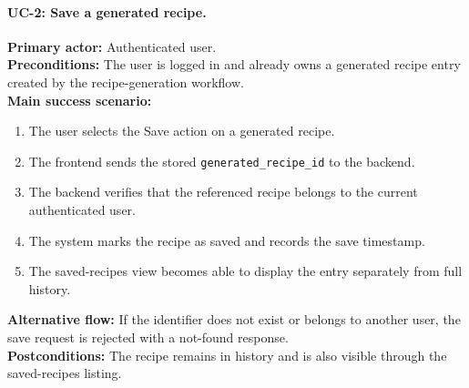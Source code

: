 \paragraph{UC-2: Save a generated recipe.}
\textbf{Primary actor:} Authenticated user. \\
\textbf{Preconditions:} The user is logged in and already owns a
generated recipe entry created by the recipe-generation workflow. \\
\textbf{Main success scenario:}
\begin{enumerate}
	\item The user selects the Save action on a generated recipe.
	\item The frontend sends the stored \texttt{generated\_recipe\_id} to
	the backend.
	\item The backend verifies that the referenced recipe belongs to the
	current authenticated user.
	\item The system marks the recipe as saved and records the save
	timestamp.
	\item The saved-recipes view becomes able to display the entry
	separately from full history.
\end{enumerate}
\textbf{Alternative flow:} If the identifier does not exist or belongs
to another user, the save request is rejected with a not-found response. \\
\textbf{Postconditions:} The recipe remains in history and is also
visible through the saved-recipes listing.

